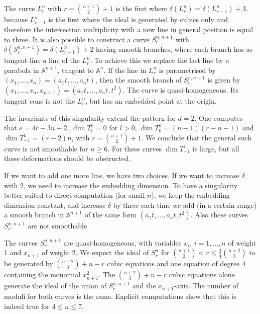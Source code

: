 \documentclass{amsart}
\newcommand{\A}{\mathbb{A}}
\renewcommand{\ell}{l}
\theoremstyle{definition}
\theoremstyle{remark}
\begin{document}
\subsection{}
The curve $L_r^n$ with  $r=\binom{n+1}2 +1$ is the first where
$\delta(L_{r}^n)=\delta(L_{r-1}^n)+3$, because $L_{r-1}^n$
is the first where the ideal is generated by
cubics only and therefore  the intersection multiplicity with a new  line in general position 
is equal to three. It is also possible to construct
a curve  $S_{r}^{n,n+1}$ with $\delta(S_{r}^{n,n+1})=\delta(L_{r-1}^n)+2$ 
having  smooth branches,
where each branch has as tangent line a line of the $L_{r}^n$.
To achieve this we  replace
the last line by a parabola in $\A^{n+1}$, tangent to $\A^n$. 
If the line in $L_{r}^n$ is parametrised by
$(x_1,\dots,x_n)=(a_1 t,\dots, a_n t)$, then the smooth branch of $S_{r}^{n,n+1}$
is given by $(x_1,\dots,x_n,x_{n+1})=(a_1 t,\dots, a_n t, t^2)$. 
The curve is quasi-homogeneous. Its tangent cone is not the  $L_{r}^n$, but has 
an embedded point at the origin.



The invariants of this singularity extend the pattern for $d=2$.
One computes that $e=4r-3n-2$, $\dim T^1_\ell=0$ for $\ell>0$,
$\dim T^1_0=(n-1)(r-n-1)$ and $\dim T^1_{-1}=(r-2)n$, with $r=\binom{n+1}2+1$. 
We conclude that the general such curve is not smoothable for $n\geq 6$.
For these curves $\dim T^1_{-1}$ is large, but all these deformations should be obstructed.

If we want to add one more line, we have two choices. If we want to increase $\delta$ with
$2$, we need to increase the embedding dimension. To have a singularity better suited
to direct computation (for small $n$), we keep the embedding dimension constant, and increase
$\delta$ by three each time we add (in a certain range) a 
smooth branch in $\A^{n+1}$ of the same form $(a_1 t,\dots, a_n t, t^2)$.
Also these curves  $S_r^{n,n+1}$ are not smoothable.  

The curves $S_r^{n,n+1}$ are quasi-homogeneous, with variables 
$x_i$, $i=1,\dots,n$ of weight 1 and $x_{n+1}$ of weight 2. We expect
the ideal of $S_r^n$  for $\binom{n+1}2< r \leq \frac34 \binom{n+2}3$ to be  
generated by $\binom{n+2}3+n-r$ cubic equations and one equation of degree 4
containing the monomial $x_{n+1}^2$. 
The $\binom{n+2}3+n-r$ cubic equations alone generate the ideal of 
the union of $S_r^{n,n+1}$ and the $x_{n+1}$-axis.
The number of moduli for both curves is the same.
Explicit computations show that this is indeed true for $4\leq n \leq 7$.
\end{document}
